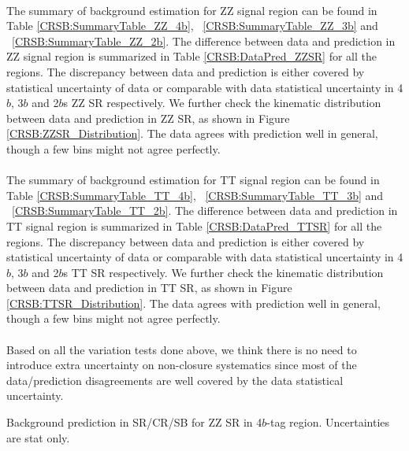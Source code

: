 \paragraph{}
The summary of background estimation for ZZ signal region can be found in Table \ref{CRSB:SummaryTable_ZZ_4b}, ~\ref{CRSB:SummaryTable_ZZ_3b} and ~\ref{CRSB:SummaryTable_ZZ_2b}. The difference between data and prediction in ZZ signal region is summarized in Table \ref{CRSB:DataPred_ZZSR} for all the regions. The discrepancy between data and prediction is either covered by statistical uncertainty of data or comparable with data statistical uncertainty in 4$b$, 3$b$ and 2$b$s ZZ SR respectively. We further check the kinematic distribution between data and prediction in ZZ SR, as shown in Figure \ref{CRSB:ZZSR_Distribution}. The data agrees with prediction well in general, though a few bins might not agree perfectly. 

\paragraph{}
The summary of background estimation for TT signal region can be found in Table \ref{CRSB:SummaryTable_TT_4b}, ~\ref{CRSB:SummaryTable_TT_3b} and ~\ref{CRSB:SummaryTable_TT_2b}. The difference between data and prediction in TT signal region is summarized in Table \ref{CRSB:DataPred_TTSR} for all the regions. The discrepancy between data and prediction is either covered by statistical uncertainty of data or comparable with data statistical uncertainty in 4$b$, 3$b$ and 2$b$s TT SR respectively. We further check the kinematic distribution between data and prediction in TT SR, as shown in Figure \ref{CRSB:TTSR_Distribution}. The data agrees with prediction well in general, though a few bins might not agree perfectly. 

\paragraph{}
Based on all the variation tests done above, we think there is no need to introduce extra uncertainty on non-closure systematics since most of the data/prediction disagreements are well covered by the data statistical uncertainty.

\begin{table}[htbp!]
\begin{center}

\end{center}
\caption{Background prediction in SR/CR/SB for ZZ SR in 4$b$-tag region. Uncertainties are stat only.}
\label{CRSB:SummaryTable_ZZ_4b}
\end{table}

